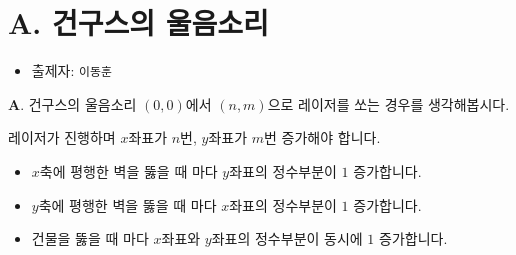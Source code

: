 \section{A. 건구스의 울음소리}

\begin{frame} %
    \begin{itemize}
        \item 출제자: \texttt{이동훈}
    \end{itemize}
\end{frame}

\begin{frame}{\textbf{A}. 건구스의 울음소리}
    $(0, 0)$에서 $(n, m)$으로 레이저를 쏘는 경우를 생각해봅시다.

    \vspace{18pt}
    
    레이저가 진행하며 $x$좌표가 $n$번, $y$좌표가 $m$번 증가해야 합니다. 
    
    \vspace{18pt}
    \begin{itemize}
        \item $x$축에 평행한 벽을 뚫을 때 마다 $y$좌표의 정수부분이 $1$ 증가합니다.
        \item $y$축에 평행한 벽을 뚫을 때 마다 $x$좌표의 정수부분이 $1$ 증가합니다.
        \item 건물을 뚫을 때 마다 $x$좌표와 $y$좌표의 정수부분이 동시에 $1$ 증가합니다.
    \end{itemize}

\end{frame}